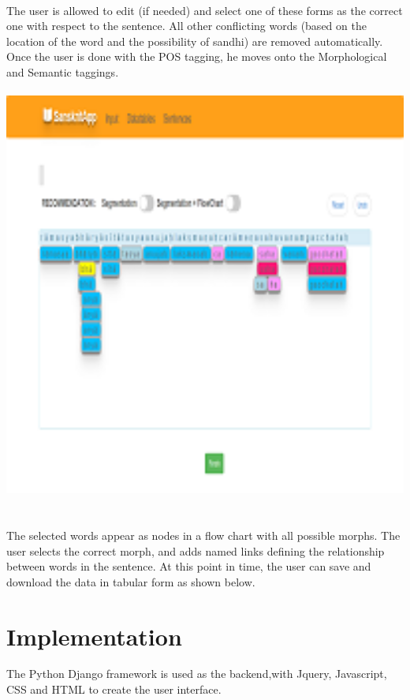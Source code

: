 \documentclass[12pt]{article}
\begin{document}
\\The user is allowed to edit (if needed) and select one of these forms as the correct one with respect to the sentence. All other conflicting words (based on the location of the word and the possibility of sandhi) are removed automatically. Once the user is done with the POS tagging, he moves onto the Morphological and Semantic taggings.\\ \\

\includegraphics[width=150mm,scale=20]{capture2}\\ \\

\\The selected words appear as nodes in a flow chart with all possible morphs. The user selects the correct morph, and adds named links defining the relationship between words in the sentence. At this point in time, the user can save and download the data in tabular form as shown below. 

\section{Implementation}
The Python Django framework is used as the backend,with Jquery, Javascript, CSS and HTML to create the user interface. 
\end{document}
